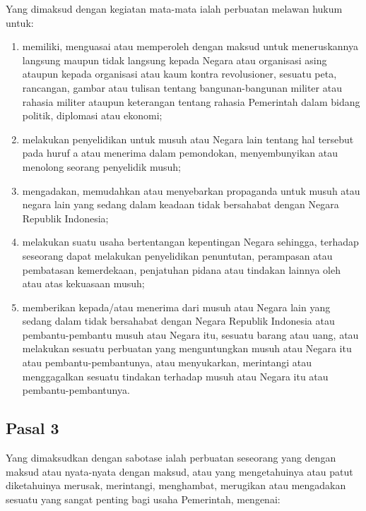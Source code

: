 \documentclass{article}
\begin{document}
Yang dimaksud dengan kegiatan mata-mata ialah perbuatan melawan hukum untuk:

\renewcommand{\labelenumi}{\alph{enumi}. }
\begin{enumerate}
\item memiliki, menguasai atau memperoleh dengan maksud untuk meneruskannya langsung maupun tidak
langsung kepada Negara atau organisasi asing ataupun kepada organisasi atau kaum kontra
revolusioner, sesuatu peta, rancangan, gambar atau tulisan tentang bangunan-bangunan militer atau
rahasia militer ataupun keterangan tentang rahasia Pemerintah dalam bidang politik, diplomasi atau
ekonomi;
\item melakukan penyelidikan untuk musuh atau Negara lain tentang hal tersebut pada huruf a atau
menerima dalam pemondokan, menyembunyikan atau menolong seorang penyelidik musuh;
\item mengadakan, memudahkan atau menyebarkan propaganda untuk musuh atau negara lain yang
sedang dalam keadaan tidak bersahabat dengan Negara Republik Indonesia;
\item melakukan suatu usaha bertentangan kepentingan Negara sehingga, terhadap seseorang dapat
melakukan penyelidikan penuntutan, perampasan atau pembatasan kemerdekaan, penjatuhan pidana
atau tindakan lainnya oleh atau atas kekuasaan musuh;
\item memberikan kepada/atau menerima dari musuh atau Negara lain yang sedang dalam tidak
bersahabat dengan Negara Republik Indonesia atau pembantu-pembantu musuh atau Negara itu,
sesuatu barang atau uang, atau melakukan sesuatu perbuatan yang menguntungkan musuh atau
Negara itu atau pembantu-pembantunya, atau menyukarkan, merintangi atau menggagalkan sesuatu
tindakan terhadap musuh atau Negara itu atau pembantu-pembantunya.
\end{enumerate}

\subsection*{\centering{}Pasal 3}

Yang dimaksudkan dengan sabotase ialah perbuatan seseorang yang dengan maksud atau nyata-nyata
dengan maksud, atau yang mengetahuinya atau patut diketahuinya merusak, merintangi, menghambat,
merugikan atau mengadakan sesuatu yang sangat penting bagi usaha Pemerintah, mengenai:
\end{document}
